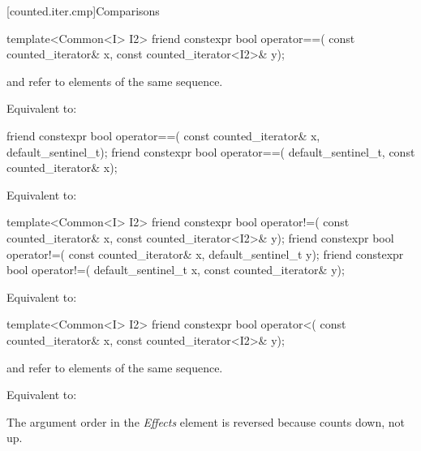 [counted.iter.cmp]{Comparisons}

%
\begin{itemdecl}
template<Common<I> I2>
  friend constexpr bool operator==(
    const counted_iterator& x, const counted_iterator<I2>& y);
\end{itemdecl}

\begin{itemdescr}
\pnum
\expects
{} and  refer to
elements of the same sequence.

\pnum
\effects Equivalent to: 
\end{itemdescr}

%
\begin{itemdecl}
friend constexpr bool operator==(
  const counted_iterator& x, default_sentinel_t);
friend constexpr bool operator==(
  default_sentinel_t, const counted_iterator& x);
\end{itemdecl}

\begin{itemdescr}
\pnum
\effects Equivalent to: 
\end{itemdescr}

%
\begin{itemdecl}
template<Common<I> I2>
  friend constexpr bool operator!=(
    const counted_iterator& x, const counted_iterator<I2>& y);
friend constexpr bool operator!=(
  const counted_iterator& x, default_sentinel_t y);
friend constexpr bool operator!=(
  default_sentinel_t x, const counted_iterator& y);
\end{itemdecl}

\begin{itemdescr}
\pnum
\effects Equivalent to: 
\end{itemdescr}

%
\begin{itemdecl}
template<Common<I> I2>
  friend constexpr bool operator<(
    const counted_iterator& x, const counted_iterator<I2>& y);
\end{itemdecl}

\begin{itemdescr}
\pnum
\expects
{} and  refer to
elements of the same sequence.

\pnum
\effects Equivalent to: 

\pnum
\begin{note}
The argument order in the \textit{Effects} element is reversed
because  counts down, not up.
\end{note}
\end{itemdescr}

